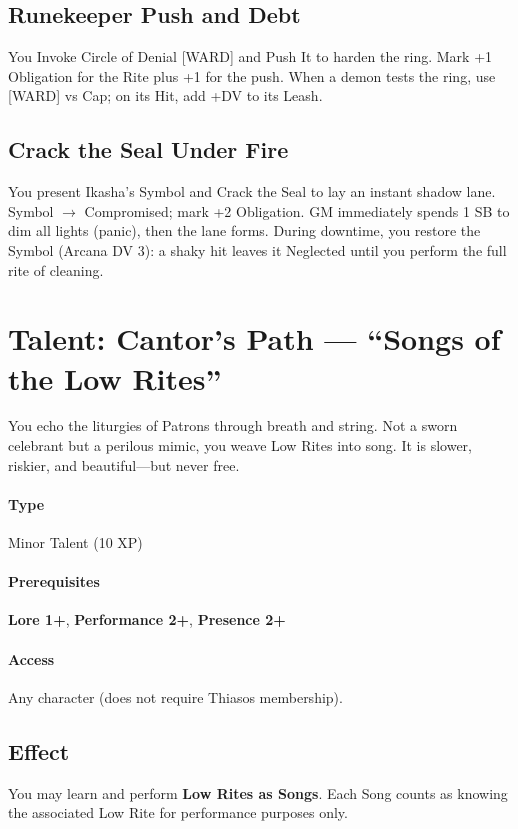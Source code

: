 \subsection*{Runekeeper Push and Debt}
You Invoke Circle of Denial [WARD] and Push It to harden the ring. Mark +1 Obligation for the Rite plus +1 for the push. When a demon tests the ring, use [WARD] vs Cap; on its Hit, add +DV to its Leash.

\subsection*{Crack the Seal Under Fire}
You present Ikasha's Symbol and Crack the Seal to lay an instant shadow lane. Symbol $\rightarrow$ Compromised; mark +2 Obligation. GM immediately spends 1 SB to dim all lights (panic), then the lane forms. During downtime, you restore the Symbol (Arcana DV 3): a shaky hit leaves it Neglected until you perform the full rite of cleaning.

\section{Talent: Cantor's Path --- ``Songs of the Low Rites''}
\label{talent:cantors-path}

\begin{tcolorbox}[colback=black!3,colframe=black!40!white,title={Cantor's Path}]
You echo the liturgies of Patrons through breath and string. Not a sworn celebrant but a perilous mimic, you weave Low Rites into song. It is slower, riskier, and beautiful---but never free.
\end{tcolorbox}

\paragraph*{Type} Minor Talent (10 XP) \quad
\paragraph*{Prerequisites} \textbf{Lore 1+}, \textbf{Performance 2+}, \textbf{Presence 2+} \quad
\paragraph*{Access} Any character (does not require Thiasos membership).

\subsection*{Effect}
You may learn and perform \textbf{Low Rites as Songs}. Each Song counts as knowing the associated Low Rite for performance purposes only.

